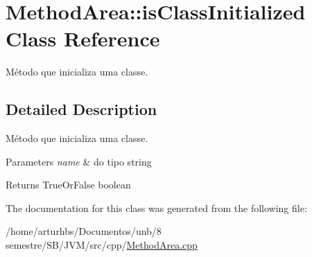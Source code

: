 \hypertarget{classMethodArea_1_1isClassInitialized}{}\section{Method\+Area\+:\+:is\+Class\+Initialized Class Reference}
\label{classMethodArea_1_1isClassInitialized}


Método que inicializa uma classe.  




\subsection{Detailed Description}
Método que inicializa uma classe. 


\begin{DoxyParams}{Parameters}
{\em name} & do tipo string \\
\hline
\end{DoxyParams}
\begin{DoxyReturn}{Returns}
True\+Or\+False boolean 
\end{DoxyReturn}


The documentation for this class was generated from the following file\+:\begin{DoxyCompactItemize}
\item 
/home/arturhbs/\+Documentos/unb/8 semestre/\+S\+B/\+J\+V\+M/src/cpp/\hyperlink{MethodArea_8cpp}{Method\+Area.\+cpp}\end{DoxyCompactItemize}
